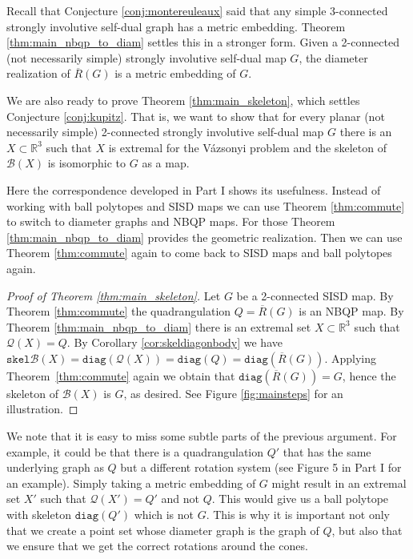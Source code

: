 \documentclass{article}
\newcounter{example}
\newcommand{\R}[0]{\mathbb{R}}
\newcommand{\Bc}[0]{\mathcal{B}}
\newcommand{\skel}[0]{\mathtt{skel}}
\newcommand{\diag}[0]{\mathtt{diag}}
\newcommand{\qt}{\mathcal{Q}}
\begin{document}
Recall that Conjecture \ref{conj:montereuleaux} said that any simple 3-connected strongly involutive self-dual graph has a metric embedding. Theorem \ref{thm:main_nbqp_to_diam} settles this in a stronger form. Given a 2-connected (not necessarily simple) strongly involutive self-dual map $G$, the diameter realization of $\overline{R}(G)$ is a metric embedding of $G$. 

We are also ready to prove Theorem \ref{thm:main_skeleton}, which settles Conjecture \ref{conj:kupitz}. That is, we want to show that for every planar (not necessarily simple) 2-connected strongly involutive self-dual map $G$ there is an $X\subset \R^3$ such that $X$ is extremal for the Vázsonyi problem and the skeleton of $\Bc(X)$ is  isomorphic to $G$ as a map. 

Here the correspondence developed in Part I shows its usefulness. Instead of working with ball polytopes and SISD maps we can use Theorem \ref{thm:commute} to switch to diameter graphs and NBQP maps. For those Theorem \ref{thm:main_nbqp_to_diam} provides the geometric realization. Then we can use Theorem \ref{thm:commute} again to come back to SISD maps and ball polytopes again. 

\begin{proof}[Proof of Theorem \ref{thm:main_skeleton}]

Let $G$ be a 2-connected SISD map. By Theorem \ref{thm:commute} the quadrangulation $Q=\overline R(G)$ is an NBQP map. By Theorem \ref{thm:main_nbqp_to_diam} there is an extremal set $X\subset\R^3$ such that $\qt(X)=Q$. By Corollary \ref{cor:skeldiagonbody} we have $\skel\Bc(X)=\diag(\qt(X))=\diag(Q)=\diag(\overline R(G))$. Applying Theorem~\ref{thm:commute} again we obtain that $\diag(\overline R(G))=G$, hence the skeleton of $\Bc(X)$ is $G$, as desired. See Figure \ref{fig:mainsteps} for an illustration.
 
\end{proof}

We note that it is easy to miss some subtle parts of the previous argument. For example, it could be that there is a quadrangulation $Q'$ that has the same underlying graph as $Q$ but a different rotation system (see Figure 5 in Part I for an example). Simply taking a metric embedding of $G$ might result in an extremal set $X'$ such that $\qt(X')=Q'$ and not $Q$. This would give us a ball polytope with skeleton $\diag(Q')$ which is not $G$. This is why it is important not only that we create a point set whose diameter graph is the graph of $Q$, but also that we ensure that we get the correct rotations around the cones. 
\end{document}
